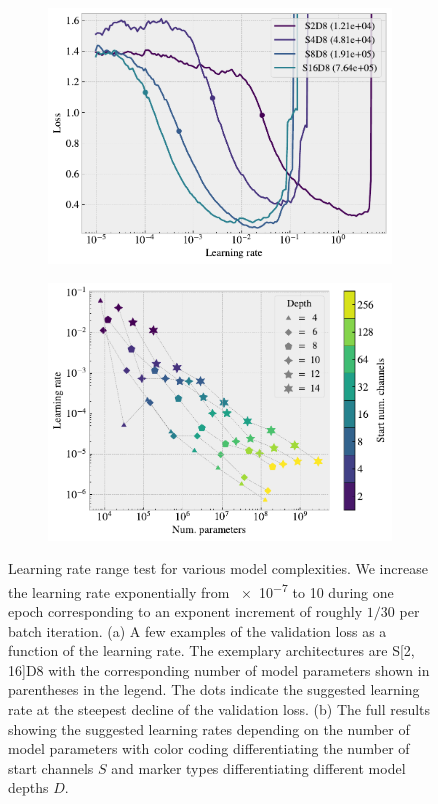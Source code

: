 \begin{figure}[!htb]
  \centering
  \begin{subfigure}[t]{0.49\textwidth}
      \centering
      \includegraphics[width=\textwidth]{figures/ML/LR_range_specific.pdf}
      \caption{}
  \end{subfigure}
  \hfill
  \begin{subfigure}[t]{0.49\textwidth}
      \centering
      \includegraphics[width=\textwidth]{figures/ML/LR_range_full.pdf}
      \caption{}
  \end{subfigure}
  \hfill
  \caption{Learning rate range test for various model complexities. We increase the learning rate exponentially from \num{e-7} to 10 during one epoch corresponding to an exponent increment of roughly $1/30$ per batch iteration. (a) A few examples of the validation loss as a function of the learning rate. The exemplary architectures are S[2, 16]D8 with the corresponding number of model parameters shown in parentheses in the legend. The dots indicate the suggested learning rate at the steepest decline of the validation loss. (b) The full results showing the suggested learning rates depending on the number of model parameters with color coding differentiating the number of start channels $S$ and marker types differentiating different model depths $D$. }
  \label{fig:LR_range}
\end{figure}


